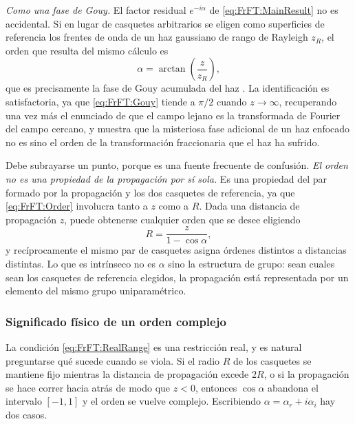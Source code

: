			\textit{Como una fase de Gouy.} El factor residual $e^{-i\alpha}$ de \eqref{eq:FrFT:MainResult} no es accidental. Si en lugar de casquetes arbitrarios se eligen como superficies de referencia los frentes de onda de un haz gaussiano de rango de Rayleigh $z_{R}$, el orden que resulta del mismo cálculo es
			\begin{equation}\label{eq:FrFT:Gouy}
				\alpha = \arctan\!\left(\frac{z}{z_{R}}\right),
			\end{equation}
			que es precisamente la fase de Gouy acumulada del haz \citep{ozaktas1995fractional}. La identificación es satisfactoria, ya que \eqref{eq:FrFT:Gouy} tiende a $\pi/2$ cuando $z\to\infty$, recuperando una vez más el enunciado de que el campo lejano es la transformada de Fourier del campo cercano, y muestra que la misteriosa fase adicional de un haz enfocado no es sino el orden de la transformación fraccionaria que el haz ha sufrido.

			Debe subrayarse un punto, porque es una fuente frecuente de confusión. \textit{El orden no es una propiedad de la propagación por sí sola.} Es una propiedad del par formado por la propagación y los dos casquetes de referencia, ya que \eqref{eq:FrFT:Order} involucra tanto a $z$ como a $R$. Dada una distancia de propagación $z$, puede obtenerse cualquier orden que se desee eligiendo
			\begin{equation}\label{eq:FrFT:ChooseR}
				R = \frac{z}{1-\cos\alpha},
			\end{equation}
			y recíprocamente el mismo par de casquetes asigna órdenes distintos a distancias distintas. Lo que es intrínseco no es $\alpha$ sino la estructura de grupo: sean cuales sean los casquetes de referencia elegidos, la propagación está representada por un elemento del mismo grupo uniparamétrico.

		\subsubsection{Significado físico de un orden complejo}

			La condición \eqref{eq:FrFT:RealRange} es una restricción real, y es natural preguntarse qué sucede cuando se viola. Si el radio $R$ de los casquetes se mantiene fijo mientras la distancia de propagación excede $2R$, o si la propagación se hace correr hacia atrás de modo que $z<0$, entonces $\cos\alpha$ abandona el intervalo $[-1,1]$ y el orden se vuelve complejo. Escribiendo $\alpha = \alpha_{r} + i\alpha_{i}$ hay dos casos.

